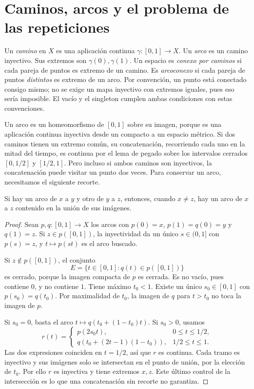 \section{Caminos, arcos y el problema de las repeticiones}
\begin{definicion}
Un \emph{camino} en $X$ es una aplicación continua $\gamma:[0,1]\to X$. Un \emph{arco} es un camino inyectivo. Sus extremos son $\gamma(0),\gamma(1)$. Un espacio es \emph{conexo por caminos} si cada pareja de puntos es extremo de un camino. Es \emph{arcoconexo} si cada pareja de puntos \emph{distintos} es extremo de un arco. Por convención, un punto está conectado consigo mismo; no se exige un mapa inyectivo con extremos iguales, pues eso sería imposible. El vacío y el singleton cumplen ambas condiciones con estas convenciones.
\end{definicion}
Un arco es un homeomorfismo de $[0,1]$ sobre su imagen, porque es una aplicación continua inyectiva desde un compacto a un espacio métrico. Si dos caminos tienen un extremo común, su concatenación, recorriendo cada uno en la mitad del tiempo, es continua por el lema de pegado sobre los intervalos cerrados $[0,1/2]$ y $[1/2,1]$. Pero incluso si ambos caminos son inyectivos, la concatenación puede visitar un punto dos veces. Para conservar un arco, necesitamos el siguiente recorte.

\begin{lema}\label{ch18:recorte}
Si hay un arco de $x$ a $y$ y otro de $y$ a $z$, entonces, cuando $x\ne z$, hay un arco de $x$ a $z$ contenido en la unión de sus imágenes.
\end{lema}
\begin{proof}
Sean $p,q:[0,1]\to X$ los arcos con $p(0)=x$, $p(1)=q(0)=y$ y $q(1)=z$. Si $z\in p([0,1])$, la inyectividad da un único $s\in(0,1]$ con $p(s)=z$, y $t\mapsto p(st)$ es el arco buscado.

Si $z\notin p([0,1])$, el conjunto
\[
E=\{t\in[0,1]:q(t)\in p([0,1])\}
\]
es cerrado, porque la imagen compacta de $p$ es cerrada. Es no vacío, pues contiene $0$, y no contiene $1$. Tiene máximo $t_0<1$. Existe un único $s_0\in[0,1]$ con $p(s_0)=q(t_0)$. Por maximalidad de $t_0$, la imagen de $q$ para $t>t_0$ no toca la imagen de $p$.

Si $s_0=0$, basta el arco $t\mapsto q(t_0+(1-t_0)t)$. Si $s_0>0$, usamos
\[
r(t)=\begin{cases}
p(2s_0t),&0\le t\le1/2,\\
q(t_0+(2t-1)(1-t_0)),&1/2\le t\le1.
\end{cases}
\]
Las dos expresiones coinciden en $t=1/2$, así que $r$ es continua. Cada tramo es inyectivo y sus imágenes solo se intersectan en el punto de unión, por la elección de $t_0$. Por ello $r$ es inyectiva y tiene extremos $x,z$. Este último control de la intersección es lo que una concatenación sin recorte no garantiza.
\end{proof}

